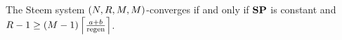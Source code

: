 \begin{theorem}
  \label{theorem:convergence:steem}
  The Steem system $\left(\playerlen, \rounds, \postlen,
  \postlen\right)$-converges if and only if $\stpowvec$ is constant and $\rounds
  - 1 \geq \left(\postlen - 1\right) \ceil*{\frac{a + b}{\regen}}$.
\end{theorem}

